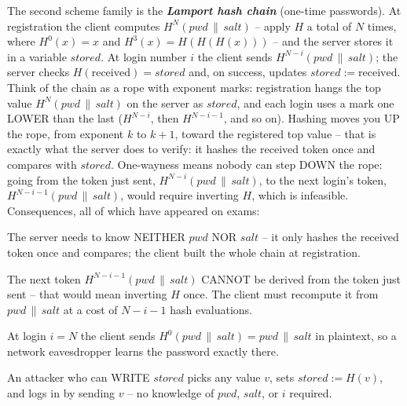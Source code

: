\documentclass[12pt, a4paper]{article}
\newcommand{\term}[1]{\textbf{\textit{#1}}}        %
\begin{document}
The second scheme family is the \term{Lamport hash chain} (one-time passwords). At registration the client computes $H^{N}(pwd \,\|\, salt)$ -- apply $H$ a total of $N$ times, where $H^{0}(x) = x$ and $H^{3}(x) = H(H(H(x)))$ -- and the server stores it in a variable $stored$. At login number $i$ the client sends $H^{N-i}(pwd \,\|\, salt)$; the server checks $H(\text{received}) = stored$ and, on success, updates $stored := \text{received}$. Think of the chain as a rope with exponent marks: registration hangs the top value $H^{N}(pwd \,\|\, salt)$ on the server as $stored$, and each login uses a mark one LOWER than the last ($H^{N-i}$, then $H^{N-i-1}$, and so on). Hashing moves you UP the rope, from exponent $k$ to $k+1$, toward the registered top value -- that is exactly what the server does to verify: it hashes the received token once and compares with $stored$. One-wayness means nobody can step DOWN the rope: going from the token just sent, $H^{N-i}(pwd \,\|\, salt)$, to the next login's token, $H^{N-i-1}(pwd \,\|\, salt)$, would require inverting $H$, which is infeasible. Consequences, all of which have appeared on exams:\begin{tightitem}\item The server needs to know NEITHER $pwd$ NOR $salt$ -- it only hashes the received token once and compares; the client built the whole chain at registration.\item The next token $H^{N-i-1}(pwd \,\|\, salt)$ CANNOT be derived from the token just sent -- that would mean inverting $H$ once. The client must recompute it from $pwd \,\|\, salt$ at a cost of $N-i-1$ hash evaluations.\item At login $i = N$ the client sends $H^{0}(pwd \,\|\, salt) = pwd \,\|\, salt$ in plaintext, so a network eavesdropper learns the password exactly there.\item An attacker who can WRITE $stored$ picks any value $v$, sets $stored := H(v)$, and logs in by sending $v$ -- no knowledge of $pwd$, $salt$, or $i$ required.\end{tightitem}
\end{document}
